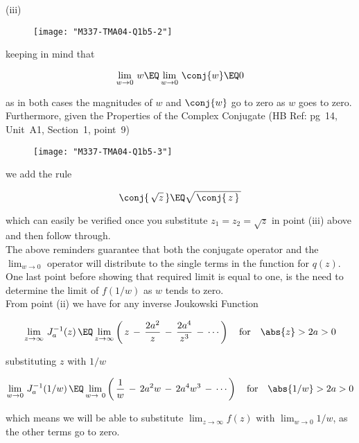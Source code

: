 \documentclass[english,a4paper,11pt]{scrartcl}
\begin{document}
\begin{labeling}{(iii) }
\bigskip
\begin{figure}[H]
	\centering
	\texttt{[image: "M337-TMA04-Q1b5-2"]}
\end{figure}

\newpage
keeping in mind that 

\[ \lim_{w\to 0} \, w \EQ \lim_{w\to 0} \, \conj{w} \EQ 0 \]

as in both cases the magnitudes of $w$ and $\conj{w}$ go to zero as $w$ goes to zero.\\

\bigskip
Furthermore, given the Properties of the Complex Conjugate (HB Ref: pg~14, Unit~A1, Section~1, point~9) \\

\bigskip
\begin{figure}[H]
	\centering
	\texttt{[image: "M337-TMA04-Q1b5-3"]}
\end{figure}

we add the rule 

\[ \conj{\,\sqrt{z} \,} \EQ   \sqrt{ \, \conj{\,z\,} \,}  \]

which can easily be verified once you substitute $z_1 = z_2 = \sqrt{z}$ in point (iii) above and then follow through. \\

\bigskip
The above reminders guarantee that both the conjugate operator and the $\displaystyle \lim_{w\to 0}$ operator will distribute to the single terms in the function for $q(z)$.\\

\bigskip
One last point before showing that required limit is equal to one, is the need to determine the limit of $f(1/w)$ as $w$ tends to zero. \\

\bigskip
From point (ii) we have for any inverse Joukowski Function

\[ \lim_{z\to\infty} {\, J_a^{-1}(z)\,}  \EQ \lim_{z\to\infty} \left(\,  z \,-\, \frac{2a^2}{z} \,-\, \frac{2a^4}{z^3}  \,-\, \cdots \,\right) \quad \text{for} \quad \abs{z} > 2a > 0 \]

\bigskip
substituting $z$ with $1/w$

\[ \lim_{w\to 0} {\, J_a^{-1}(1/w)\,}  \EQ \lim_{w\to\ 0} \left(\, \frac1{w} \,-\, 2a^2w \,-\, 2a^4w^3  \,-\, \cdots \,\right) \quad \text{for} \quad \abs{1/w} > 2a > 0 \]

\bigskip
which means we will be able to substitute $\displaystyle \lim_{z\to\infty} f(z)$ with $\displaystyle \lim_{w\to 0} 1/w$, as the other terms go to zero.\\


\end{labeling}
\end{document}
